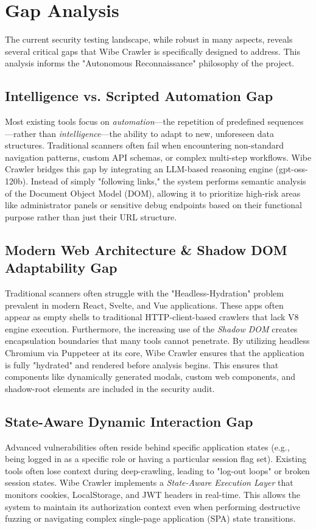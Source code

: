 \documentclass[12pt,oneside,a4paper]{book}
\begin{document}
\section{Gap Analysis}
\label{sec:gapanalysis}

The current security testing landscape, while robust in many aspects, reveals several critical gaps that Wibe Crawler is specifically designed to address. This analysis informs the "Autonomous Reconnaissance" philosophy of the project.

\subsection{Intelligence vs. Scripted Automation Gap}
Most existing tools focus on \textit{automation}---the repetition of predefined sequences---rather than \textit{intelligence}---the ability to adapt to new, unforeseen data structures. Traditional scanners often fail when encountering non-standard navigation patterns, custom API schemas, or complex multi-step workflows. Wibe Crawler bridges this gap by integrating an LLM-based reasoning engine (gpt-oss-120b). Instead of simply "following links," the system performs semantic analysis of the Document Object Model (DOM), allowing it to prioritize high-risk areas like administrator panels or sensitive debug endpoints based on their functional purpose rather than just their URL structure.

\subsection{Modern Web Architecture \& Shadow DOM Adaptability Gap}
Traditional scanners often struggle with the "Headless-Hydration" problem prevalent in modern React, Svelte, and Vue applications. These apps often appear as empty shells to traditional HTTP-client-based crawlers that lack V8 engine execution. Furthermore, the increasing use of the \textit{Shadow DOM} creates encapsulation boundaries that many tools cannot penetrate. By utilizing headless Chromium via Puppeteer at its core, Wibe Crawler ensures that the application is fully "hydrated" and rendered before analysis begins. This ensures that components like dynamically generated modals, custom web components, and shadow-root elements are included in the security audit.

\subsection{State-Aware Dynamic Interaction Gap}
Advanced vulnerabilities often reside behind specific application states (e.g., being logged in as a specific role or having a particular session flag set). Existing tools often lose context during deep-crawling, leading to "log-out loops" or broken session states. Wibe Crawler implements a \textit{State-Aware Execution Layer} that monitors cookies, LocalStorage, and JWT headers in real-time. This allows the system to maintain its authorization context even when performing destructive fuzzing or navigating complex single-page application (SPA) state transitions.
\end{document}

